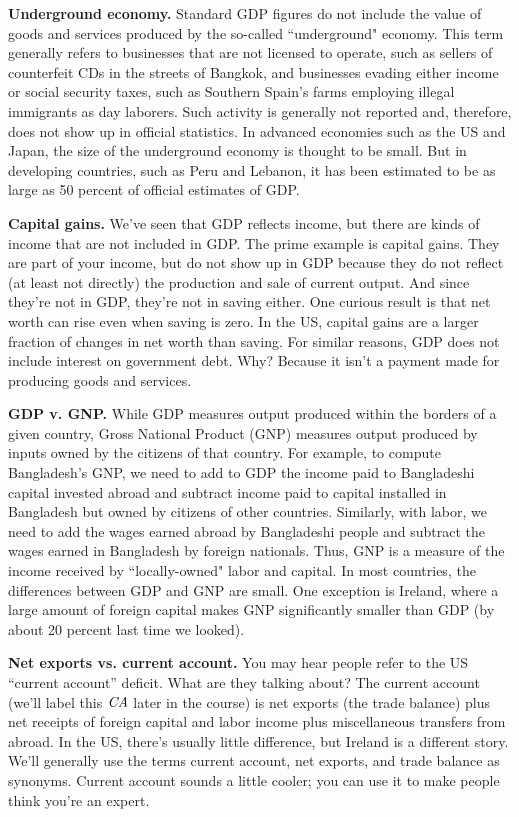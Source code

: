 \textbf{Underground economy. 
 }
Standard GDP figures do not include the value of goods and
services produced by the so-called ``underground" economy. This
term generally refers to businesses that are not licensed to
operate, such as sellers of counterfeit CDs in the streets of
Bangkok, and businesses evading either income or social security
taxes, such as Southern Spain's farms employing illegal immigrants
as day laborers.  Such activity is generally not reported and,
therefore, does not show up in official statistics. In advanced
economies such as the US and Japan, the size of the underground
economy is thought to be small.  But in developing countries, such
as Peru and Lebanon, it has been estimated to be as large as 50 percent
of official estimates of GDP.

\textbf{Capital gains.} We've seen that GDP reflects income, but
there are kinds of income that are not included in GDP. The
prime example is capital gains. They are part of your income, but
do not show up in GDP because they do not reflect (at least not
directly) the production and sale of current output. And since
they're not in GDP, they're not in saving either.
One curious result is that net worth can rise even when saving is zero.
In the US, capital gains are a larger fraction of changes in net worth
than saving.
For similar reasons, GDP does not include interest on government debt.
Why?  Because it isn't a payment
made for producing goods and services.


\textbf{GDP v. GNP.}
While GDP measures output produced within the borders of a
given country, Gross National Product (GNP) 
measures output produced by
inputs owned by the citizens of that country. For example, to
compute Bangladesh's GNP, we need to add to GDP the income
paid to Bangladeshi capital invested abroad and subtract income
paid to capital installed in Bangladesh but owned by citizens of
other countries. Similarly, with labor, we need to add the wages
earned abroad by Bangladeshi people and subtract the wages earned
in Bangladesh by foreign nationals. Thus, GNP is a measure of
the income received by ``locally-owned" labor and capital. In most
countries, the differences between GDP and GNP are small.
One exception is Ireland, where a large amount of foreign capital
makes GNP significantly smaller than GDP (by about 20 percent last
time we looked).

\textbf{Net exports vs. current account.}  
 You may hear people refer
to the US ``current account'' deficit. What are they talking
about? The current account (we'll label this $\mbox{\it CA\/}$
later in the course) is net exports
 (the trade balance) plus net
receipts of foreign capital and labor income plus miscellaneous
transfers from abroad. In the US, there's usually little difference, but Ireland is a different story.  We'll generally use the terms
current account, net exports, and trade balance as synonyms.
Current account sounds a little cooler;
you can use it to make people think you're an expert.


